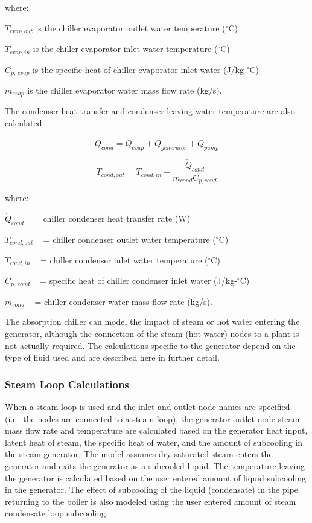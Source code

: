 where:

\({T_{evap,out}}\) is the chiller evaporator outlet water temperature (\(^{\circ}\)C)

\({T_{evap,in}}\) is the chiller evaporator inlet water temperature (\(^{\circ}\)C)

\({C_{p,\,evap}}\) is the specific heat of chiller evaporator inlet water (J/kg-\(^{\circ}\)C)

\({\dot m_{evap}}\) is the chiller evaporator water mass flow rate (kg/s).

The condenser heat transfer and condenser leaving water temperature are also calculated.

\begin{equation}
{\dot Q_{cond}} = {\dot Q_{evap}} + {\dot Q_{generator}} + {\dot Q_{pump}}
\end{equation}

\begin{equation}
  T_{cond,out} = T_{cond,in} + \frac{\dot{Q}_{cond}}{\dot{m}_{cond}C_{p,cond}}
\end{equation}

where:

\({\dot Q_{cond}}\) ~ = chiller condenser heat transfer rate (W)

\({T_{cond,out}}\) ~ = chiller condenser outlet water temperature (\(^{\circ}\)C)

\({T_{cond,in}}\) ~ = chiller condenser inlet water temperature (\(^{\circ}\)C)

\({C_{p,\,cond}}\) ~ = specific heat of chiller condenser inlet water (J/kg-\(^{\circ}\)C)

\({\dot m_{cond}}\) ~ = chiller condenser water mass flow rate (kg/s).

The absorption chiller can model the impact of steam or hot water entering the generator, although the connection of the steam (hot water) nodes to a plant is not actually required. The calculations specific to the generator depend on the type of fluid used and are described here in further detail.

\subsubsection{Steam Loop Calculations}\label{steam-loop-calculations-1}

When a steam loop is used and the inlet and outlet node names are specified (i.e.~the nodes are connected to a steam loop), the generator outlet node steam mass flow rate and temperature are calculated based on the generator heat input, latent heat of steam, the specific heat of water, and the amount of subcooling in the steam generator. The model assumes dry saturated steam enters the generator and exits the generator as a subcooled liquid. The temperature leaving the generator is calculated based on the user entered amount of liquid subcooling in the generator. The effect of subcooling of the liquid (condensate) in the pipe returning to the boiler is also modeled using the user entered amount of steam condensate loop subcooling.

